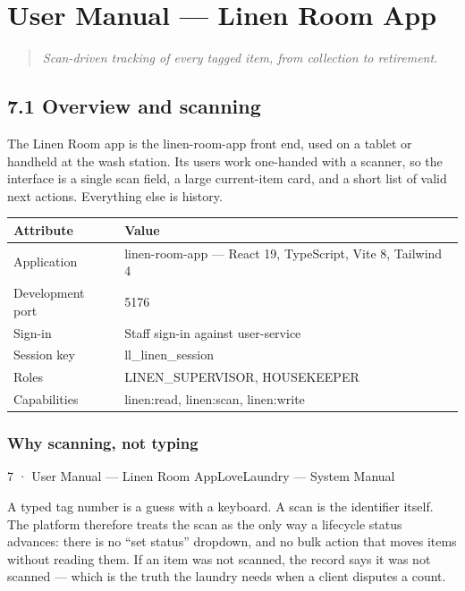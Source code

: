 \documentclass[11pt,a4paper,oneside]{book}
\begin{document}
\chapter{User Manual — Linen Room App}
\begin{quote}\itshape Scan-driven tracking of every tagged item, from collection to retirement.\end{quote}
\section{7.1 Overview and scanning}
The Linen Room app is the linen-room-app front end, used on a tablet or handheld at the wash station. Its users work one-handed with a scanner, so the interface is a single scan field, a large current-item card, and a short list of valid next actions. Everything else is history.

\begin{center}\small
\begin{tabularx}{\linewidth}{|X|X|}
\hline
\rowcolor{lightgrey}
\textbf{Attribute} & \textbf{Value} \\ \hline
Application & linen-room-app — React 19, TypeScript, Vite 8, Tailwind 4 \\ \hline
Development port & 5176 \\ \hline
Sign-in & Staff sign-in against user-service \\ \hline
Session key & ll\_linen\_session \\ \hline
Roles & LINEN\_SUPERVISOR, HOUSEKEEPER \\ \hline
Capabilities & linen:read, linen:scan, linen:write \\ \hline
\end{tabularx}
\end{center}
\subsection*{Why scanning, not typing}
7 · User Manual — Linen Room AppLoveLaundry — System Manual

A typed tag number is a guess with a keyboard. A scan is the identifier itself. The platform therefore treats the scan as the only way a lifecycle status advances: there is no “set status” dropdown, and no bulk action that moves items without reading them. If an item was not scanned, the record says it was not scanned — which is the truth the laundry needs when a client disputes a count.
\end{document}
